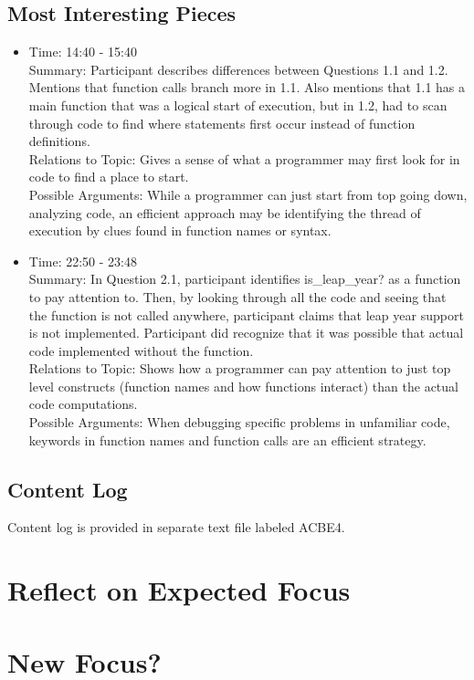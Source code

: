 \documentclass{article}
\begin{document}
\subsection{Most Interesting Pieces}
\begin{itemize}
  \item Time: 14:40 - 15:40 \\
  Summary:  Participant describes differences between Questions 1.1 and 1.2. Mentions that function calls branch more in 1.1. Also mentions that 1.1 has a main function that was a logical start of execution, but in 1.2, had to scan through code to find where statements first occur instead of function definitions. \\
  Relations to Topic: Gives a sense of what a programmer may first look for in code to find a place to start. \\
  Possible Arguments: While a programmer can just start from top going down, analyzing code, an efficient approach may be identifying the thread of execution by clues found in function names or syntax. 
  \item Time: 22:50 - 23:48 \\
  Summary: In Question 2.1, participant identifies is\_leap\_year? as a function to pay attention to. Then, by looking through all the code and seeing that the function is not called anywhere, participant claims that leap year support is not implemented. Participant did recognize that it was possible that actual code implemented without the function. \\
  Relations to Topic:  Shows how a programmer can pay attention to just top level constructs (function names and how functions interact) than the actual code computations. \\
  Possible Arguments: When debugging specific problems in unfamiliar code, keywords in function names and function calls are an efficient strategy.
\end{itemize}

\subsection{Content Log}
Content log is provided in separate text file labeled ACBE4.

\newpage
\section{Reflect on Expected Focus}
\section{New Focus?}
\end{document}

